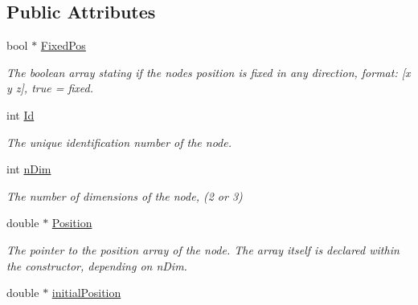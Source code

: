 \subsection*{Public Attributes}
\begin{DoxyCompactItemize}
\item 
\hypertarget{classNode_a80edc54e934bdfc08b66933d4c7fd6f4}{}bool $\ast$ \hyperlink{classNode_a80edc54e934bdfc08b66933d4c7fd6f4}{Fixed\+Pos}\label{classNode_a80edc54e934bdfc08b66933d4c7fd6f4}

\begin{DoxyCompactList}\small\item\em The boolean array stating if the node\textquotesingle{}s position is fixed in any direction, format\+: \mbox{[}x y z\mbox{]}, true = fixed. \end{DoxyCompactList}\item 
\hypertarget{classNode_a1bd379569cc1a8b96432e61971aed4d9}{}int \hyperlink{classNode_a1bd379569cc1a8b96432e61971aed4d9}{Id}\label{classNode_a1bd379569cc1a8b96432e61971aed4d9}

\begin{DoxyCompactList}\small\item\em The unique identification number of the node. \end{DoxyCompactList}\item 
\hypertarget{classNode_ae23958d63ecbf80559c307c955be8227}{}int \hyperlink{classNode_ae23958d63ecbf80559c307c955be8227}{n\+Dim}\label{classNode_ae23958d63ecbf80559c307c955be8227}

\begin{DoxyCompactList}\small\item\em The number of dimensions of the node, (2 or 3) \end{DoxyCompactList}\item 
\hypertarget{classNode_a8fdca7042dc0cc7e342eb3c87cbbfb56}{}double $\ast$ \hyperlink{classNode_a8fdca7042dc0cc7e342eb3c87cbbfb56}{Position}\label{classNode_a8fdca7042dc0cc7e342eb3c87cbbfb56}

\begin{DoxyCompactList}\small\item\em The pointer to the position array of the node. The array itself is declared within the constructor, depending on n\+Dim. \end{DoxyCompactList}\item 
\hypertarget{classNode_a653a595186a56f86fcdb6d431daa4591}{}double $\ast$ \hyperlink{classNode_a653a595186a56f86fcdb6d431daa4591}{initial\+Position}\label{classNode_a653a595186a56f86fcdb6d431daa4591}


\end{DoxyCompactItemize}
